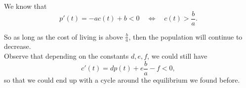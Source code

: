 We know that 
$$
p'(t) = -a c(t) + b < 0 \quad \Leftrightarrow \quad c(t) > \frac{b}{a}.
$$

So as long as the cost of living is above $\frac{b}{a}$, then the population will continue to decrease. \\

Observe that depending on the constants $d, e, f$, we could still have
$$
c'(t) = d p(t) + e \frac{b}{a} - f < 0,
$$
so that we could end up with a cycle around the equilibrium we found before.








